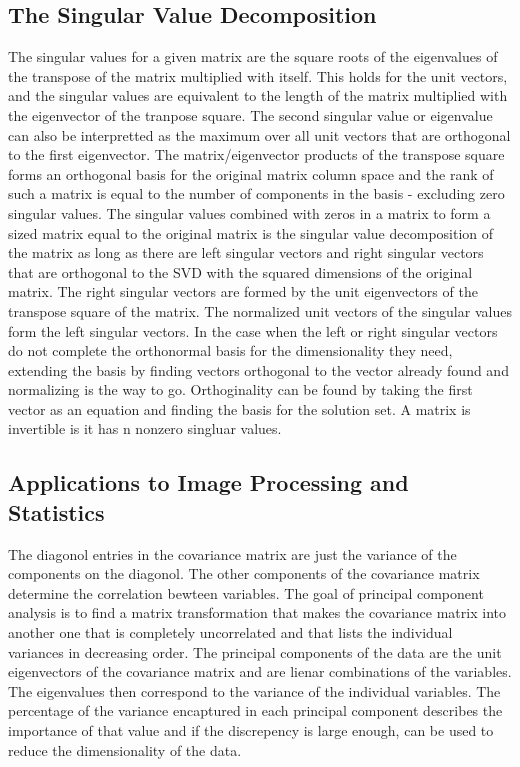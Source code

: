 \documentclass[12pt]{article}
\begin{document}
\subsection{The Singular Value Decomposition}
The singular values for a given matrix are the square roots of the eigenvalues of the transpose of the matrix multiplied with itself. This holds for the unit vectors, and the singular values 
are equivalent to the length of the matrix multiplied with the eigenvector of the tranpose square. The second singular value or eigenvalue can also be interpretted as the maximum over all 
unit vectors that are orthogonal to the first eigenvector. The matrix/eigenvector products of the transpose square forms an orthogonal basis for the original matrix column space and 
the rank of such a matrix is equal to the number of components in the basis - excluding zero singular values. The singular values combined with zeros in a matrix to form a sized matrix equal 
to the original matrix is the singular value decomposition of the matrix as long as there are left singular vectors and right singular vectors that are orthogonal to the SVD with the squared 
dimensions of the original matrix. The right singular vectors are formed by the unit eigenvectors of the transpose square of the matrix. The normalized unit vectors of the singular values 
form the left singular vectors. In the case when the left or right singular vectors  do not complete the orthonormal basis for the dimensionality they need, extending the basis by finding 
vectors orthogonal to the vector already found and normalizing is the way to go. Orthoginality can be found by taking the first vector as an equation and finding the basis for the solution 
set. A matrix is invertible is it has n nonzero singluar values. 
\subsection{Applications to Image Processing and Statistics}
The diagonol entries in the covariance matrix are just the variance of the components on the diagonol. The other components of the covariance matrix determine the correlation bewteen 
variables. The goal of principal component analysis is to find a matrix transformation that makes the covariance matrix into another one that is completely uncorrelated and that lists the 
individual variances in decreasing order. The principal components of the data are the unit eigenvectors of the covariance matrix and are lienar combinations of the variables. 
The eigenvalues then correspond to the variance of the individual variables. The percentage of the variance encaptured in each principal component describes the importance of that value 
and if the discrepency is large enough, can be used to reduce the dimensionality of the data. 
\end{document}
